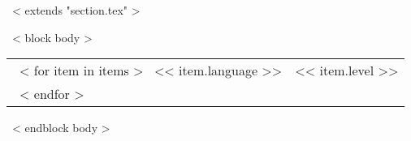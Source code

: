 ~< extends "section.tex" >~

~< block body >~
\begin{tabular}{p{3cm}p{12cm}}
  ~< for item in items >~
    << item.language >> & << item.level >> \\[1ex]
  ~< endfor >~
\end{tabular}
~< endblock body >~
